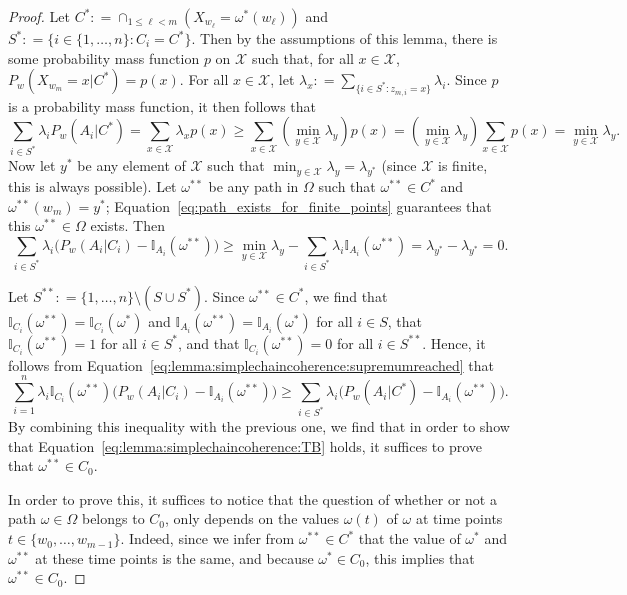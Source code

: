 \documentclass[10pt,a4paper]{paper}
\theoremstyle{definition}
\newcommand{\states}{\mathcal{X}}
\newcommand{\ind}[1]{\mathbb{I}_{#1}}
\newcommand{\coloneqq}{:\!=}
\begin{document}
\begin{proof}
Let $C^*\coloneqq\cap_{1\leq \ell<m}(X_{w_\ell}=\omega^*(w_\ell))$ and $S^*\coloneqq\{i\in\{1,\dots,n\}\colon C_i=C^*\}$. Then by the assumptions of this lemma, there is some probability mass function $p$ on $\states$ such that, for all $x\in\states$, $P_w(X_{w_m}=x\vert C^*)=p(x)$. 
For all $x\in\states$, let $\lambda_x\coloneqq\sum_{\{i\in S^*\colon z_{m,i}=x\}}\lambda_i$.
Since $p$ is a probability mass function, it then follows that
\begin{equation*}
\sum_{i\in S^*}\lambda_i P_w(A_i\vert C^*)
=
\sum_{x\in\states}
\lambda_x p(x)
\geq
\sum_{x\in\states} \left(\min_{y\in\states}\lambda_y\right) p(x)
=
\left(\min_{y\in\states}\lambda_y\right)\sum_{x\in\states}p(x)
=\min_{y\in\states}\lambda_y.
\end{equation*}
Now let $y^*$ be any element of $\states$ such that $\min_{y\in\states}\lambda_y=\lambda_{y^*}$ (since $\states$ is finite, this is always possible). Let $\omega^{**}$ be any path in $\Omega$ such that $\omega^{**}\in C^*$ and $\omega^{**}(w_m)=y^*$; Equation~\eqref{eq:path_exists_for_finite_points} guarantees that this $\omega^{**}\in\Omega$ exists. Then
\begin{equation*}
\sum_{i\in S^*}\lambda_i\bigl(P_w(A_i\vert C_i)-\ind{A_i}(\omega^{**})\bigr)
\geq
\min_{y\in\states}\lambda_y
-\sum_{i\in S^*}\lambda_i\ind{A_i}(\omega^{**})
=\lambda_{y^*}-\lambda_{y^*}=0.
\end{equation*}

Let $S^{**}\coloneqq\{1,\dots,n\}\setminus(S\cup S^*)$. Since $\omega^{**}\in C^*$, we find that $\ind{C_i}(\omega^{**})=\ind{C_i}(\omega^{*})$ and $\ind{A_i}(\omega^{**})=\ind{A_i}(\omega^{*})$ for all $i\in S$, that $\ind{C_i}(\omega^{**})=1$ for all $i\in S^{*}$, and that $\ind{C_i}(\omega^{**})=0$ for all $i\in S^{**}$. Hence, it follows from Equation~\eqref{eq:lemma:simplechaincoherence:supremumreached} that
\begin{equation*}
\sum_{i=1}^n\lambda_i\ind{C_i}(\omega^{**})\bigl(P_w(A_i\vert C_i)-\ind{A_i}(\omega^{**})\bigr)
\geq
\sum_{i\in S^*}\lambda_i\bigl(P_w(A_i\vert C^*)-\ind{A_i}(\omega^{**})\bigr).
\end{equation*}
By combining this inequality with the previous one, we find that in order to show that Equation~\eqref{eq:lemma:simplechaincoherence:TB} holds, it suffices to prove that $\omega^{**}\in C_0$. 

In order to prove this, it suffices to notice that the question of whether or not a path $\omega\in\Omega$ belongs to $C_0$, only depends on the values $\omega(t)$ of $\omega$ at time points $t\in\{w_0,\dots,w_{m-1}\}$. Indeed, since we infer from $\omega^{**}\in C^*$ that the value of $\omega^*$ and $\omega^{**}$ at these time points is the same, and because $\omega^*\in C_0$, this implies that $\omega^{**}\in C_0$.
\end{proof}
\end{document}
